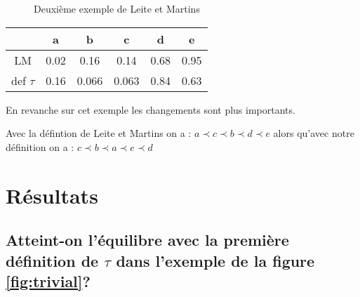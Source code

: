 \documentclass[12pt]{article}
\theoremstyle{defi}
\theoremstyle{not}
\theoremstyle{prob}
\begin{document}
          \begin{figure}
            \centering
            \caption{Deuxième exemple de Leite et Martins}
            \label{fig:LM2_example}
          \end{figure}

          \begin{tabular}{|c|c|c|c|c|c|}
            \hline
                       & a    & b     & c     & d    & e \\
            \hline
            LM         & 0.02 & 0.16  & 0.14  & 0.68 & 0.95 \\
            \hline
            def $\tau$ & 0.16 & 0.066 & 0.063 & 0.84 & 0.63\\
            \hline
          \end{tabular}

          En revanche sur cet exemple les changements sont plus importants.

          Avec la défintion de Leite et Martins on a : $a \prec c \prec b \prec d \prec e$ alors qu'avec notre définition on a : $c \prec b \prec a \prec e \prec d$


  \section{Résultats}
    \subsection{Atteint-on l'équilibre avec la première définition de $\tau$ dans l'exemple de la figure \ref{fig:trivial}?}
\end{document}
